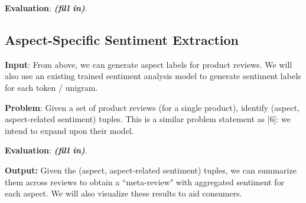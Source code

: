 \documentclass{article} %
\begin{document}
\textbf{Evaluation}: {\it \bf (fill in)}.

\subsection{Aspect-Specific Sentiment Extraction}

\textbf{Input}: From above, we can generate aspect labels for product reviews. We will also use an existing trained sentiment analysis model to generate sentiment labels for each token / unigram.

\textbf{Problem}: Given a set of product reviews (for a single product), identify (aspect, aspect-related sentiment) tuples. This is a similar problem statement as [6]: we intend to expand upon their model.

\textbf{Evaluation}: {\it \bf (fill in)}.

\textbf{Output:} Given the (aspect, aspect-related sentiment) tuples, we can summarize them across reviews to obtain a ``meta-review" with aggregated sentiment for each aspect. We will also visualize these results to aid consumers.





\end{document}
